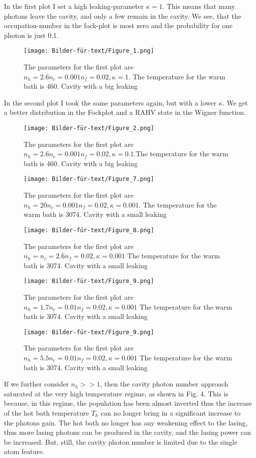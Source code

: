 \documentclass[12pt,a4paper]{article}
\begin{document}
In the first plot I set a high leaking-parameter $\kappa=1$.
This means that many photons leave the cavity, and only a few remain in the cavity. 
We see, that the occupation-number in the fock-plot is most zero and the probability for one photon is just 0.1.

\begin{figure}[hbtp]
\centering
\texttt{[image: Bilder-für-text/Figure\_1.png]}
\caption{The parameters for the first plot are$ n_h=2.6 n_c=0.001 n_f=0.02,\kappa=1$. The temperature for the warm bath is 460. Cavity with a big leaking}
\end{figure}\newpage

In the second plot I took the same parameters again, but with a lower $\kappa$. We get a better distribution in the Fockplot and a RAHV state in the Wigner function. 

\begin{figure}[hbtp]
\centering
\texttt{[image: Bilder-für-text/Figure\_2.png]}
\caption{The parameters for the first plot are $n_h=2.6 n_c=0.001 n_f=0.02,\kappa=0.1$.The temperature for the warm bath is 460. Cavity with a big leaking}
\end{figure}

\begin{figure}[hbtp]
\centering
\texttt{[image: Bilder-für-text/Figure\_7.png]}
\caption{The parameters for the first plot are$ n_h=20 n_c=0.001 n_f=0.02,\kappa=0.001$. The temperature for the warm bath is 3074. Cavity with a small leaking}
\end{figure}


\begin{figure}[hbtp]
\centering
\texttt{[image: Bilder-für-text/Figure\_8.png]}
\caption{The parameters for the first plot are $ n_h=n_c=2.6 n_f=0.02,\kappa=0.001$ The temperature for the warm bath is 3074. Cavity with a small leaking}
\end{figure}

\begin{figure}[hbtp]
\centering
\texttt{[image: Bilder-für-text/Figure\_9.png]}
\caption{The parameters for the first plot are $ n_h=1.7 n_c=0.01 n_f=0.02,\kappa=0.001$ The temperature for the warm bath is 3074. Cavity with a small leaking}
\end{figure}
\begin{figure}[hbtp]
\centering
\texttt{[image: Bilder-für-text/Figure\_9.png]}
\caption{The parameters for the first plot are $ n_h=5.5 n_c=0.01 n_f=0.02,\kappa=0.001$ The temperature for the warm bath is 3074. Cavity with a small leaking}
\end{figure}
If we further consider  $n_h >>1$,
then the cavity photon number approach saturated at the very
high temperature regime, as shown in Fig. 4. This is because,
in this regime, the population has been almost inverted
 thus the increase of the hot bath temperature $T_h$
can no longer bring in a significant increase to the photons gain.
The hot bath no longer has
any weakening effect to the lasing, thus more lasing photons
can be produced in the cavity, and the lasing power can be
increased. But, still, the cavity photon number is limited due to
the single atom feature.%
\end{document}
